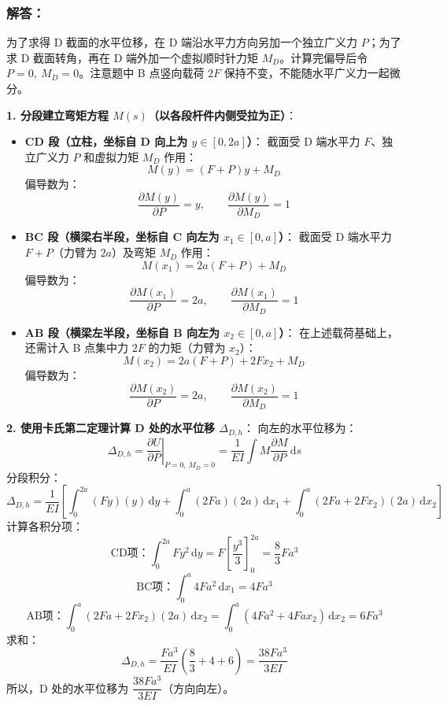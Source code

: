 \documentclass[11pt,a4paper]{ctexrep}
\newcommand{\diff}{\,\mathrm{d}}
\begin{document}
{\flushleft

\subsubsection*{解答：}

为了求得 D 截面的水平位移，在 D 端沿水平力方向另加一个独立广义力 $P$；为了求 D 截面转角，再在 D 端外加一个虚拟顺时针力矩 $M_D$。计算完偏导后令 $P=0,\ M_D=0$。注意题中 B 点竖向载荷 $2F$ 保持不变，不能随水平广义力一起微分。

\textbf{1. 分段建立弯矩方程 $M(s)$（以各段杆件内侧受拉为正）}：
\begin{itemize}
    \item \textbf{CD 段（立柱，坐标自 D 向上为 $y \in [0, 2a]$）}：
          截面受 D 端水平力 $F$、独立广义力 $P$ 和虚拟力矩 $M_D$ 作用：
          \[
              M(y) = (F+P)y + M_D
          \]
          偏导数为：
          \[
              \frac{\partial M(y)}{\partial P} = y, \qquad \frac{\partial M(y)}{\partial M_D} = 1
          \]
    \item \textbf{BC 段（横梁右半段，坐标自 C 向左为 $x_1 \in [0, a]$）}：
          截面受 D 端水平力 $F+P$（力臂为 $2a$）及弯矩 $M_D$ 作用：
          \[
              M(x_1) = 2a(F+P) + M_D
          \]
          偏导数为：
          \[
              \frac{\partial M(x_1)}{\partial P} = 2a, \qquad \frac{\partial M(x_1)}{\partial M_D} = 1
          \]
    \item \textbf{AB 段（横梁左半段，坐标自 B 向左为 $x_2 \in [0, a]$）}：
          在上述载荷基础上，还需计入 B 点集中力 $2F$ 的力矩（力臂为 $x_2$）：
          \[
              M(x_2) = 2a(F+P) + 2F x_2 + M_D
          \]
          偏导数为：
          \[
              \frac{\partial M(x_2)}{\partial P} = 2a, \qquad \frac{\partial M(x_2)}{\partial M_D} = 1
          \]
\end{itemize}

\textbf{2. 使用卡氏第二定理计算 D 处的水平位移 $\Delta_{D,h}$}：
向左的水平位移为：
\[
    \Delta_{D,h} = \left. \frac{\partial U}{\partial P} \right|_{P=0,\,M_D = 0} = \frac{1}{EI} \int M \frac{\partial M}{\partial P} \diff s
\]
分段积分：
\[
    \Delta_{D,h} = \frac{1}{EI} \left[ \int_0^{2a} (Fy)(y) \diff y + \int_0^a (2Fa)(2a) \diff x_1 + \int_0^a (2Fa+2Fx_2)(2a) \diff x_2 \right]
\]
计算各积分项：
\[
    \text{CD项：} \int_0^{2a} F y^2 \diff y = F \left[ \frac{y^3}{3} \right]_0^{2a} = \frac{8}{3} F a^3
\]
\[
    \text{BC项：} \int_0^a 4 F a^2 \diff x_1 = 4 F a^3
\]
\[
    \text{AB项：} \int_0^a (2Fa+2Fx_2)(2a)\diff x_2
    =\int_0^a (4Fa^2+4Fax_2)\diff x_2=6Fa^3
\]
求和：
\[
    \Delta_{D,h} = \frac{F a^3}{EI} \left( \frac{8}{3} + 4 + 6 \right) = \frac{38Fa^3}{3EI}
\]
所以，D 处的水平位移为 \textbf{$\dfrac{38Fa^3}{3EI}$}（方向向左）。

}
\end{document}
